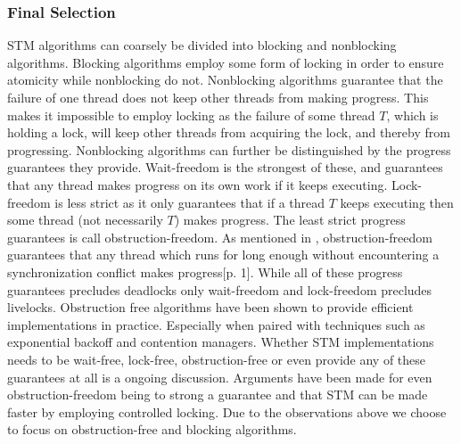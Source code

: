 \subsubsection{Final Selection}
\ac{STM} algorithms can coarsely be divided into blocking and nonblocking algorithms\cite[p. 47]{harris2010transactional}. Blocking algorithms employ some form of locking in order to ensure atomicity while nonblocking do not\cite[p. 59]{herlihy2012art}. Nonblocking algorithms guarantee that the failure of one thread does not keep other threads from making progress\cite[p. 47]{harris2010transactional}\cite[p. 142]{herlihy1991wait}\cite[p. 59]{herlihy2012art}. This  makes it impossible to employ locking as the failure of some thread $T$, which is holding a lock, will keep other threads from acquiring the lock, and thereby from progressing. Nonblocking algorithms can further be distinguished by the progress guarantees they provide. Wait-freedom is the strongest of these, and guarantees that any thread makes progress on its own work if it keeps executing\cite[p. 124]{herlihy1991wait}\cite[p. 59]{herlihy2012art}. Lock-freedom is less strict as it only guarantees that if a thread $T$ keeps executing then some thread (not necessarily $T$) makes progress\cite[p. 47]{harris2010transactional}\cite[p. 60]{herlihy2012art}. The least strict progress guarantees is call obstruction-freedom\cite[p. 47]{harris2010transactional}\cite{herlihy2003obstruction}\cite[p. 61]{herlihy2012art}. As mentioned in , obstruction-freedom guarantees that any thread which runs for long enough without encountering a synchronization conflict makes progress\cite{herlihy2003obstruction}[p. 1]. While all of these progress guarantees precludes deadlocks only wait-freedom and lock-freedom precludes livelocks\cite[p. 47]{harris2010transactional}. Obstruction free algorithms have been shown to provide efficient implementations in practice\cite[p. 61]{herlihy2012art}. Especially when paired with techniques such as exponential backoff\cite[p. 147]{herlihy2012art} and contention managers\cite[p. 51]{harris2010transactional}.  Whether \ac{STM} implementations needs to be wait-free, lock-free, obstruction-free or even provide any of these guarantees at all is a ongoing discussion. Arguments have been made for even obstruction-freedom being to strong a guarantee and that \ac{STM} can be made faster by employing controlled locking\cite{ennals2006software}. Due to the observations above we choose to focus on obstruction-free and blocking algorithms.

